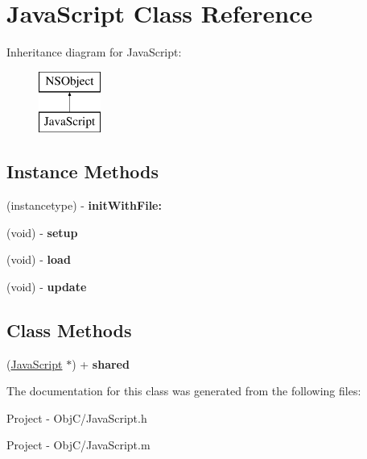 \hypertarget{interface_java_script}{}\section{Java\+Script Class Reference}
\label{interface_java_script}
Inheritance diagram for Java\+Script\+:\begin{figure}[H]
\begin{center}
\leavevmode
\includegraphics[height=2.000000cm]{interface_java_script}
\end{center}
\end{figure}
\subsection*{Instance Methods}
\begin{DoxyCompactItemize}
\item 
\hypertarget{interface_java_script_a3359ff8a4eec75a1dd9f2f0a95b4e3ed}{}(instancetype) -\/ {\bfseries init\+With\+File\+:}\label{interface_java_script_a3359ff8a4eec75a1dd9f2f0a95b4e3ed}

\item 
\hypertarget{interface_java_script_aa7a6ade3416a71c08edf7a32d44beb52}{}(void) -\/ {\bfseries setup}\label{interface_java_script_aa7a6ade3416a71c08edf7a32d44beb52}

\item 
\hypertarget{interface_java_script_a9bb57aeee9ade3109c79f2913505afff}{}(void) -\/ {\bfseries load}\label{interface_java_script_a9bb57aeee9ade3109c79f2913505afff}

\item 
\hypertarget{interface_java_script_ae9300dd8ab1b4feec69950cac2939eaa}{}(void) -\/ {\bfseries update}\label{interface_java_script_ae9300dd8ab1b4feec69950cac2939eaa}

\end{DoxyCompactItemize}
\subsection*{Class Methods}
\begin{DoxyCompactItemize}
\item 
\hypertarget{interface_java_script_ae2b0fd1256513487e5ceb1163d6d17b7}{}(\hyperlink{interface_java_script}{Java\+Script} $\ast$) + {\bfseries shared}\label{interface_java_script_ae2b0fd1256513487e5ceb1163d6d17b7}

\end{DoxyCompactItemize}


The documentation for this class was generated from the following files\+:\begin{DoxyCompactItemize}
\item 
Project -\/ Obj\+C/Java\+Script.\+h\item 
Project -\/ Obj\+C/Java\+Script.\+m\end{DoxyCompactItemize}
